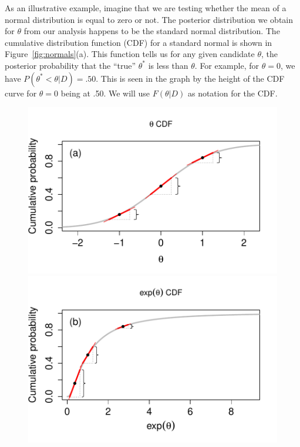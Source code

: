 \documentclass[9pt,twocolumn,twoside]{cidlab-draft}\templatetype{cidlab-invited}
\begin{document}
As an illustrative example, imagine that we are testing whether the mean of a normal distribution is equal to zero or not. The posterior distribution we obtain for $\theta$ from our analysis happens to be the standard normal distribution. The cumulative distribution function (CDF) for a standard normal is shown in Figure~\ref{fig:normals}(a). This function tells us for any given candidate $\theta$, the posterior probability that the ``true'' $\theta^*$ is less than $\theta$. For example, for $\theta=0$, we have $P(\theta^*<\theta|D) = .50$. This is seen in the graph by the height of the CDF curve for $\theta=0$ being at .50. We will use $F(\theta|D)$ as notation for the CDF.

\begin{figure}[tb]
    \centering
    \includegraphics[trim=0 40 30 40,clip,scale=.4]{p/figure2a.pdf}
    \includegraphics[trim=48 40 30 40,clip,scale=.4]{p/figure2b.pdf}

\end{figure}
\end{document}
